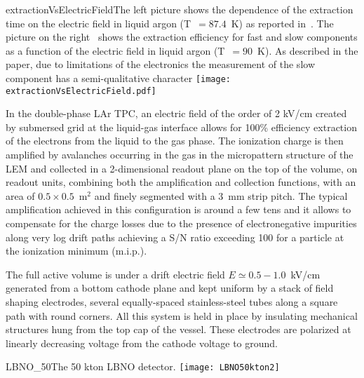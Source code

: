 \begin{cdrfigure}{extractionVsElectricField}{The left picture shows the dependence of the extraction time on the electric field in liquid argon (T~$= 87.4$~K) as reported in~\cite{Borghesani1990}.
The picture on the right~\cite{Gushchin1982b} shows the extraction efficiency for fast and slow components as a function of the electric field in liquid argon (T~$= 90$~K). As described in the paper, due to limitations of the electronics the measurement of the slow component has a semi-qualitative character}
\texttt{[image: extractionVsElectricField.pdf]}
\end{cdrfigure}

In the double-phase LAr TPC, an electric field of the order of 2 kV/cm created by submersed grid at the liquid-gas interface allows for 100\% efficiency extraction of the electrons from the liquid to the gas phase. The ionization charge is then amplified by avalanches occurring in the gas in the micropattern structure of the LEM and collected in a 2-dimensional readout plane on the top of the volume, on readout units, combining both the amplification and collection functions, with an area of $0.5\times 0.5$~m$^2$ and finely segmented with a 3~mm strip pitch. The typical amplification achieved in this configuration is around a few tens and it allows to compensate for the charge losses due to the presence of electronegative impurities along very log drift paths achieving a S/N ratio exceeding 100 for a particle at the ionization minimum (m.i.p.).

The full active volume  is under a drift electric field  $E{\simeq} 0.5-1.0$~kV/cm generated from a bottom cathode plane and kept uniform by a stack of field shaping electrodes, several equally-spaced stainless-steel tubes along a square path with round corners. All this system is held in place by insulating mechanical structures hung from the top cap of the vessel. These electrodes are polarized at linearly decreasing voltage from the cathode voltage to ground. 


\begin{cdrfigure}{LBNO_50}{The 50 kton LBNO detector.}
\texttt{[image: LBNO50kton2]}
\end{cdrfigure}

